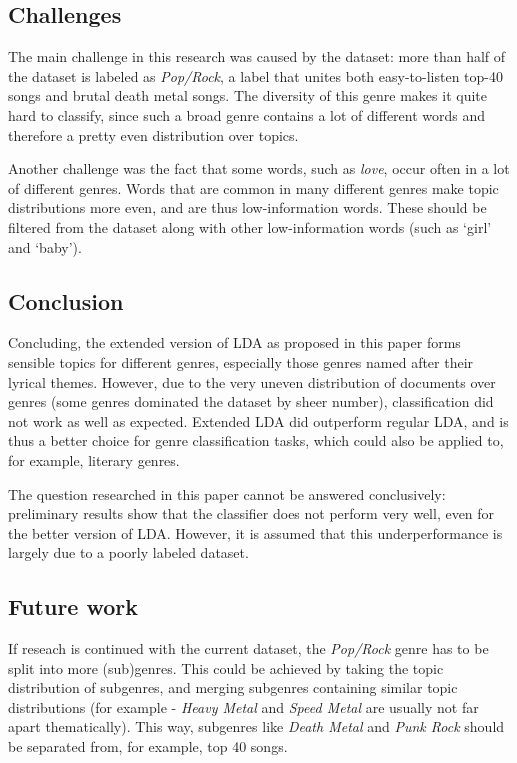 \subsection{Challenges}
The main challenge in this research was caused by the dataset: more than half of the dataset is labeled as \textit{Pop/Rock}, a label that unites both easy-to-listen top-40 songs and brutal death metal songs. The diversity of this genre makes it quite hard to classify, since such a broad genre contains a lot of different words and therefore a pretty even distribution over topics. 

Another challenge was the fact that some words, such as \textit{love}, occur often in a lot of different genres. Words that are common in many different genres make topic distributions more even, and are thus low-information words. These should be filtered from the dataset along with other low-information words (such as `girl' and `baby').

\subsection{Conclusion}
Concluding, the extended version of LDA as proposed in this paper forms sensible topics for different genres, especially those genres named after their lyrical themes. However, due to the very uneven distribution of documents over genres (some genres dominated the dataset by sheer number), classification did not work as well as expected. Extended LDA did outperform regular LDA, and is thus a better choice for genre classification tasks, which could also be applied to, for example, literary genres.

The question researched in this paper cannot be answered conclusively: preliminary results show that the classifier does not perform very well, even for the better version of LDA. However, it is assumed that this underperformance is largely due to a poorly labeled dataset. 


\subsection{Future work}
If reseach is continued with the current dataset, the \textit{Pop/Rock} genre has to be split into more (sub)genres. This could be achieved by taking the topic distribution of subgenres, and merging subgenres containing similar topic distributions (for example - \textit{Heavy Metal} and \textit{Speed Metal} are usually not far apart thematically). This way, subgenres like \textit{Death Metal} and \textit{Punk Rock} should be separated from, for example, top 40 songs. 

